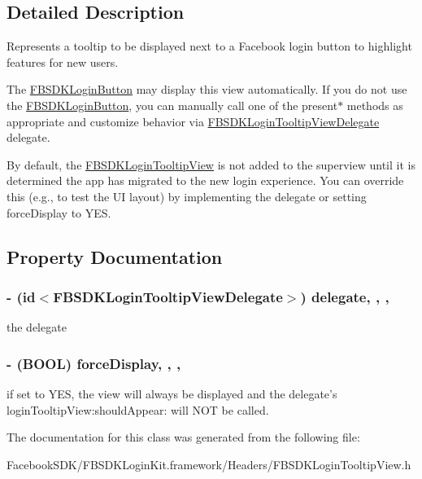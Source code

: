 \subsection{Detailed Description}
Represents a tooltip to be displayed next to a Facebook login button to highlight features for new users.

The {\ttfamily \hyperlink{interface_f_b_s_d_k_login_button}{F\-B\-S\-D\-K\-Login\-Button}} may display this view automatically. If you do not use the {\ttfamily \hyperlink{interface_f_b_s_d_k_login_button}{F\-B\-S\-D\-K\-Login\-Button}}, you can manually call one of the {\ttfamily present$\ast$} methods as appropriate and customize behavior via {\ttfamily \hyperlink{protocol_f_b_s_d_k_login_tooltip_view_delegate-p}{F\-B\-S\-D\-K\-Login\-Tooltip\-View\-Delegate}} delegate.

By default, the {\ttfamily \hyperlink{interface_f_b_s_d_k_login_tooltip_view}{F\-B\-S\-D\-K\-Login\-Tooltip\-View}} is not added to the superview until it is determined the app has migrated to the new login experience. You can override this (e.\-g., to test the U\-I layout) by implementing the delegate or setting {\ttfamily force\-Display} to Y\-E\-S. 

\subsection{Property Documentation}
\hypertarget{interface_f_b_s_d_k_login_tooltip_view_a8f0879fab37905fb4b8f29515a055c00}{
\subsubsection[{delegate}]{\setlength{\rightskip}{0pt plus 5cm}-\/ (id$<${\bf F\-B\-S\-D\-K\-Login\-Tooltip\-View\-Delegate}$>$) delegate\hspace{0.3cm}{\ttfamily [read]}, {\ttfamily [write]}, {\ttfamily [nonatomic]}, {\ttfamily [assign]}}}\label{interface_f_b_s_d_k_login_tooltip_view_a8f0879fab37905fb4b8f29515a055c00}
the delegate \hypertarget{interface_f_b_s_d_k_login_tooltip_view_a5d7116f500f006d7d1d0d5c826b0b493}{
\subsubsection[{force\-Display}]{\setlength{\rightskip}{0pt plus 5cm}-\/ (B\-O\-O\-L) force\-Display\hspace{0.3cm}{\ttfamily [read]}, {\ttfamily [write]}, {\ttfamily [nonatomic]}, {\ttfamily [assign]}}}\label{interface_f_b_s_d_k_login_tooltip_view_a5d7116f500f006d7d1d0d5c826b0b493}
if set to Y\-E\-S, the view will always be displayed and the delegate's {\ttfamily login\-Tooltip\-View\-:should\-Appear\-:} will N\-O\-T be called. 

The documentation for this class was generated from the following file\-:\begin{DoxyCompactItemize}
\item 
Facebook\-S\-D\-K/\-F\-B\-S\-D\-K\-Login\-Kit.\-framework/\-Headers/F\-B\-S\-D\-K\-Login\-Tooltip\-View.\-h\end{DoxyCompactItemize}
